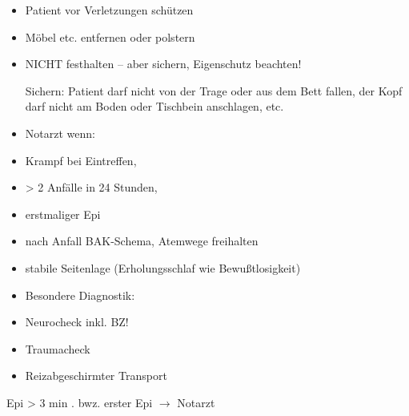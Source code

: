 \documentclass{article}
\begin{document}
\begin{itemize}
\item Patient vor Verletzungen sch\"utzen

\item M\"obel etc. entfernen oder polstern

\item NICHT festhalten -- aber sichern, Eigenschutz beachten!

\begin{center}
\begin{minipage}{4.2cm}
Sichern: Patient darf nicht von der Trage oder aus dem Bett fallen, der
Kopf darf nicht am Boden oder Tischbein anschlagen, etc.

\end{minipage}
\end{center}
\item %
%
Notarzt wenn: 

\end{itemize}
\begin{itemize}
\item Krampf bei Eintreffen, 

\item {\textgreater} 2 Anf\"alle in 24 Stunden, 

\item erstmaliger Epi

\end{itemize}
\begin{itemize}
\item nach Anfall BAK-Schema, Atemwege freihalten

\item stabile Seitenlage  (Erholungsschlaf wie  Bewu{\ss}tlosigkeit)

\item Besondere Diagnostik: 

\end{itemize}
\begin{itemize}
\item Neurocheck inkl. BZ! 

\item Traumacheck 

\end{itemize}
\begin{itemize}
\item Reizabgeschirmter Transport

\end{itemize}
Epi {\textgreater} 3 min . bwz. erster  Epi ${\rightarrow}$ Notarzt
\end{document}
